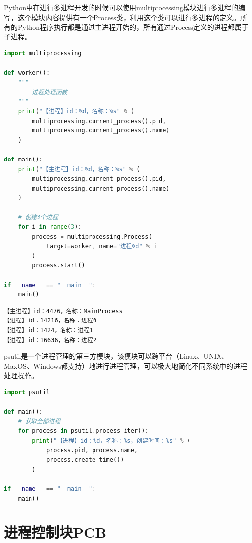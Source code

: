 Python中在进行多进程开发的时候可以使用multiprocessing模块进行多进程的编写，这个模块内容提供有一个Process类，利用这个类可以进行多进程的定义。所有的Python程序执行都是通过主进程开始的，所有通过Process定义的进程都属于子进程。\\


\begin{lstlisting}[language=Python]
import multiprocessing

def worker():
	"""
		进程处理函数
	"""
	print("【进程】id：%d，名称：%s" % (
		multiprocessing.current_process().pid,
		multiprocessing.current_process().name)
	)

def main():
	print("【主进程】id：%d，名称：%s" % (
		multiprocessing.current_process().pid,
		multiprocessing.current_process().name)
	)

	# 创建3个进程
	for i in range(3):
		process = multiprocessing.Process(
			target=worker, name="进程%d" % i
		)
		process.start()

if __name__ == "__main__":
	main()
\end{lstlisting}

\begin{tcolorbox}
    \begin{verbatim}
【主进程】id：4476，名称：MainProcess
【进程】id：14216，名称：进程0
【进程】id：1424，名称：进程1
【进程】id：16636，名称：进程2
	\end{verbatim}
\end{tcolorbox}

psutil是一个进程管理的第三方模块，该模块可以跨平台（Linux、UNIX、MaxOS、Windows都支持）地进行进程管理，可以极大地简化不同系统中的进程处理操作。\\


\begin{lstlisting}[language=Python]
import psutil

def main():
	# 获取全部进程
	for process in psutil.process_iter():
		print("【进程】id：%d，名称：%s，创建时间：%s" % (
			process.pid, process.name,
			process.create_time())
		)

if __name__ == "__main__":
	main()
\end{lstlisting}

\newpage

\section{进程控制块PCB}

